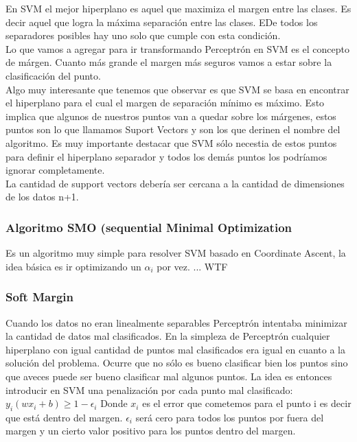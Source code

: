 \documentclass[titlepage,a4paper]{article}
\begin{document}
En SVM el mejor hiperplano es aquel que maximiza el margen entre las clases. Es decir aquel que logra la máxima separación entre las clases. EDe todos los separadores posibles hay uno solo que cumple con esta condición. \\

Lo que vamos a agregar para ir transformando Perceptrón en SVM es el concepto de márgen. Cuanto más grande el margen más seguros vamos a estar sobre la clasificación del punto. \\

Algo muy interesante que tenemos que observar es que SVM se basa en encontrar el hiperplano para el cual el margen de separación mínimo es máximo. Esto implica que algunos de nuestros puntos van a quedar sobre los márgenes, estos puntos son lo que llamamos Suport Vectors y son los que derinen el nombre del algoritmo. Es muy importante destacar que SVM sólo necestia de estos puntos para definir el hiperplano separador y todos los demás puntos los podríamos ignorar completamente. \\

La cantidad de support vectors debería ser cercana a la cantidad de dimensiones de los datos n+1. 

\subsubsection*{Algoritmo SMO (sequential Minimal Optimization}
Es un algoritmo muy simple para resolver SVM basado en Coordinate Ascent, la idea básica es ir optimizando un $\alpha_i$ por vez. ... WTF


\subsubsection*{Soft Margin}
Cuando los datos no eran linealmente separables Perceptrón intentaba minimizar la cantidad de datos mal clasificados. En la simpleza de Perceptrón cualquier hiperplano con igual cantidad de puntos mal clasificados era igual en cuanto a la solución del problema. Ocurre que no sólo es bueno clasificar bien los puntos sino que aveces puede ser bueno clasificar mal algunos puntos. La idea es entonces introducir en SVM una penalización por cada punto mal clasificado: $y_i (wx_i +b) \geq 1-\epsilon_i$ Donde $x_i$ es el error que cometemos para el punto i es decir que está dentro del margen. $\epsilon_i$ será cero para todos los puntos por fuera del margen y un cierto valor positivo para los puntos dentro del margen.  \\
\end{document}

